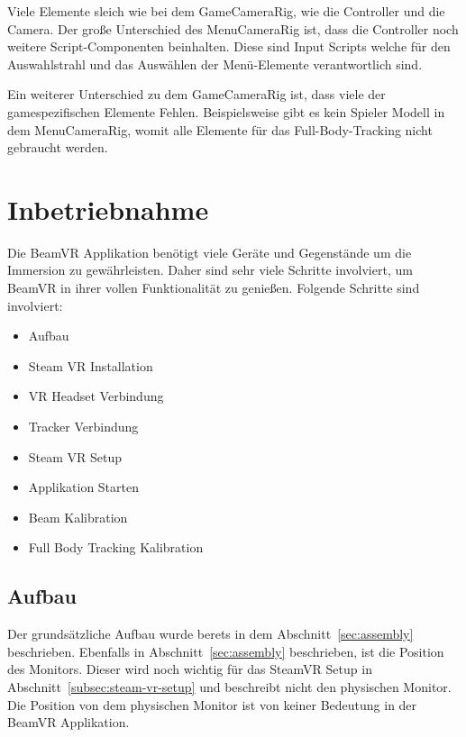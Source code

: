 Viele Elemente sleich wie bei dem GameCameraRig, wie die Controller und die Camera.
Der große Unterschied des MenuCameraRig ist, dass die Controller noch weitere Script-Componenten beinhalten.
Diese sind Input Scripts welche für den Auswahlstrahl und das Auswählen der Menü-Elemente verantwortlich sind.


Ein weiterer Unterschied zu dem GameCameraRig ist, dass viele der gamespezifischen Elemente Fehlen.
Beispielsweise gibt es kein Spieler Modell in dem MenuCameraRig, womit alle Elemente für das Full-Body-Tracking nicht gebraucht werden.

\section{Inbetriebnahme}
\label{sec:commissioning}


Die BeamVR Applikation benötigt viele Geräte und Gegenstände um die Immersion zu gewährleisten.
Daher sind sehr viele Schritte involviert, um BeamVR in ihrer vollen Funktionalität zu genießen.
Folgende Schritte sind involviert:

\begin{itemize}
    \item Aufbau
    \item Steam VR Installation
    \item VR Headset Verbindung
    \item Tracker Verbindung
    \item Steam VR Setup
    \item Applikation Starten
    \item Beam Kalibration
    \item Full Body Tracking Kalibration
\end{itemize}


\subsection{Aufbau}

Der grundsätzliche Aufbau wurde berets in dem Abschnitt~\ref{sec:assembly} beschrieben.
Ebenfalls in Abschnitt~\ref{sec:assembly} beschrieben, ist die Position des Monitors.
Dieser wird noch wichtig für das SteamVR Setup in Abschnitt~\ref{subsec:steam-vr-setup} und beschreibt nicht den physischen Monitor.
Die Position von dem physischen Monitor ist von keiner Bedeutung in der BeamVR Applikation.

